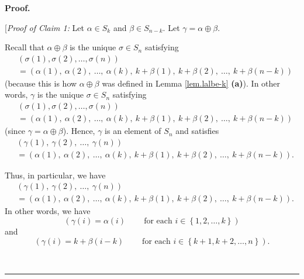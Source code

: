 \documentclass[numbers=enddot,12pt,final,onecolumn,notitlepage,english]{scrartcl}%
\theoremstyle{definition}
\newenvironment{statement}{\begin{quote}}{\end{quote}}
\newenvironment{proof}[1][Proof]{\noindent\textbf{#1.} }{\ \rule{0.5em}{0.5em}}
\newenvironment{verlong}{}{}
\begin{document}
\begin{verlong}
\begin{proof}
\begin{statement}
\end{statement}

[\textit{Proof of Claim 1:} Let $\alpha\in S_{k}$ and $\beta\in S_{n-k}$. Let
$\gamma=\alpha\oplus\beta$.

Recall that $\alpha\oplus\beta$ is the unique $\sigma\in S_{n}$ satisfying%
\begin{align*}
&  \left(  \sigma\left(  1\right)  ,\sigma\left(  2\right)  ,\ldots
,\sigma\left(  n\right)  \right) \\
&  =\left(  \alpha\left(  1\right)  ,\ \alpha\left(  2\right)  ,\ \ldots
,\ \alpha\left(  k\right)  ,\ k+\beta\left(  1\right)  ,\ k+\beta\left(
2\right)  ,\ \ldots,\ k+\beta\left(  n-k\right)  \right)
\end{align*}
(because this is how $\alpha\oplus\beta$ was defined in Lemma
\ref{lem.lalbe-k} \textbf{(a)}). In other words, $\gamma$ is the unique
$\sigma\in S_{n}$ satisfying%
\begin{align*}
&  \left(  \sigma\left(  1\right)  ,\sigma\left(  2\right)  ,\ldots
,\sigma\left(  n\right)  \right) \\
&  =\left(  \alpha\left(  1\right)  ,\ \alpha\left(  2\right)  ,\ \ldots
,\ \alpha\left(  k\right)  ,\ k+\beta\left(  1\right)  ,\ k+\beta\left(
2\right)  ,\ \ldots,\ k+\beta\left(  n-k\right)  \right)
\end{align*}
(since $\gamma=\alpha\oplus\beta$). Hence, $\gamma$ is an element of $S_{n}$
and satisfies
\begin{align*}
&  \left(  \gamma\left(  1\right)  ,\ \gamma\left(  2\right)  ,\ \ldots
,\ \gamma\left(  n\right)  \right) \\
&  =\left(  \alpha\left(  1\right)  ,\ \alpha\left(  2\right)  ,\ \ldots
,\ \alpha\left(  k\right)  ,\ k+\beta\left(  1\right)  ,\ k+\beta\left(
2\right)  ,\ \ldots,\ k+\beta\left(  n-k\right)  \right)  .
\end{align*}


Thus, in particular, we have%
\begin{align*}
&  \left(  \gamma\left(  1\right)  ,\ \gamma\left(  2\right)  ,\ \ldots
,\ \gamma\left(  n\right)  \right) \\
&  =\left(  \alpha\left(  1\right)  ,\ \alpha\left(  2\right)  ,\ \ldots
,\ \alpha\left(  k\right)  ,\ k+\beta\left(  1\right)  ,\ k+\beta\left(
2\right)  ,\ \ldots,\ k+\beta\left(  n-k\right)  \right)  .
\end{align*}
In other words, we have%
\begin{equation}
\left(  \gamma\left(  i\right)  =\alpha\left(  i\right)
\ \ \ \ \ \ \ \ \ \ \text{for each }i\in\left\{  1,2,\ldots,k\right\}
\right)  \label{pf.lem.block-tria-rowdet.prod=prodprod.pf.1}%
\end{equation}
and%
\begin{equation}
\left(  \gamma\left(  i\right)  =k+\beta\left(  i-k\right)
\ \ \ \ \ \ \ \ \ \ \text{for each }i\in\left\{  k+1,k+2,\ldots,n\right\}
\right)  . \label{pf.lem.block-tria-rowdet.prod=prodprod.pf.2}%
\end{equation}



\end{proof}
\end{verlong}
\end{document}
